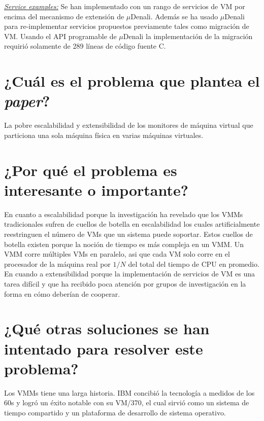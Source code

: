\underline{\emph{Service examples:}} Se han implementado con un rango de servicios de VM por encima del mecanismo de extensión de $\mu$Denali. Además se ha usado $\mu$Denali para re-implementar servicios propuestos previamente tales como migración de VM. Usando el API programable de $\mu$Denali la implementación de la migración requirió solamente de 289 líneas de código fuente C.


\section{¿Cuál es el problema que plantea el \textit{paper}?}
La pobre escalabilidad y extensibilidad de los monitores de máquina virtual que particiona una sola máquina física en varias máquinas virtuales.

\section{¿Por qué el problema es interesante o importante?}
En cuanto a escalabilidad porque la investigación ha revelado que los VMMs tradicionales sufren de cuellos de botella en escalabilidad los cuales artificialmente reestringuen el número de VMs que un sistema puede soportar. Estos cuellos de botella existen porque la noción de tiempo es más compleja en un VMM. Un VMM corre múltiples VMs en paralelo, asi que cada VM solo corre en el procesador de la máquina real por $1/N$ del total del tiempo de CPU en promedio.
En cuando a extensibilidad porque la implementación de servicios de VM es una tarea difícil y que ha recibido poca atención por grupos de investigación en la forma en cómo deberían de cooperar.

\section{¿Qué otras soluciones se han intentado para resolver este problema?}
Los VMMs tiene una larga historia. IBM concibió la tecnología a medidos de los 60s y logró un éxito notable con su VM/370, el cual sirvió como un sistema de tiempo compartido y un plataforma de desarrollo de sistema operativo.
     
